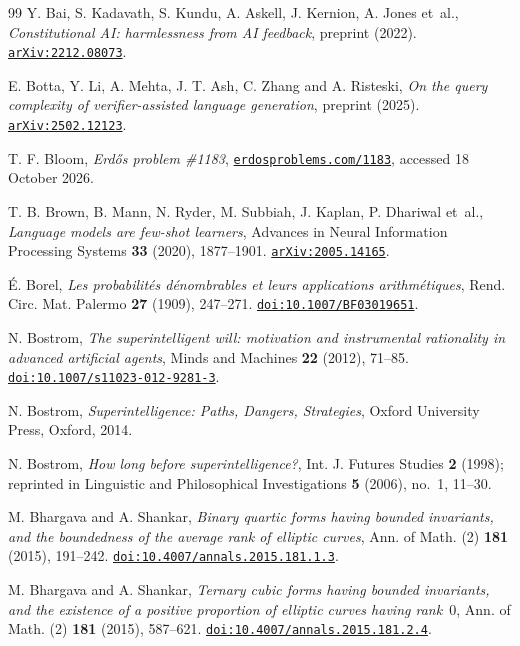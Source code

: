 \begin{thebibliography}{99}
Y. Bai, S. Kadavath, S. Kundu, A. Askell, J. Kernion, A. Jones et~al.,
\emph{Constitutional AI: harmlessness from AI feedback},
preprint (2022).
\href{https://arxiv.org/abs/2212.08073}{\nolinkurl{arXiv:2212.08073}}.

E. Botta, Y. Li, A. Mehta, J. T. Ash, C. Zhang and A. Risteski,
\emph{On the query complexity of verifier-assisted language generation},
preprint (2025).
\href{https://arxiv.org/abs/2502.12123}{\nolinkurl{arXiv:2502.12123}}.

T. F. Bloom,
\emph{Erd\H{o}s problem \#1183},
\href{https://www.erdosproblems.com/1183}{\nolinkurl{erdosproblems.com/1183}}, accessed 18 October 2026.

T. B. Brown, B. Mann, N. Ryder, M. Subbiah, J. Kaplan, P. Dhariwal et~al.,
\emph{Language models are few-shot learners},
Advances in Neural Information Processing Systems \textbf{33} (2020), 1877--1901.
\href{https://arxiv.org/abs/2005.14165}{\nolinkurl{arXiv:2005.14165}}.

\'E. Borel,
\emph{Les probabilit\'es d\'enombrables et leurs applications arithm\'etiques},
Rend. Circ. Mat. Palermo \textbf{27} (1909), 247--271.
\href{https://doi.org/10.1007/BF03019651}{\nolinkurl{doi:10.1007/BF03019651}}.

N. Bostrom,
\emph{The superintelligent will: motivation and instrumental rationality in advanced artificial agents},
Minds and Machines \textbf{22} (2012), 71--85.
\href{https://doi.org/10.1007/s11023-012-9281-3}{\nolinkurl{doi:10.1007/s11023-012-9281-3}}.

N. Bostrom,
\emph{Superintelligence: Paths, Dangers, Strategies},
Oxford University Press, Oxford, 2014.

N. Bostrom,
\emph{How long before superintelligence?},
Int. J. Futures Studies \textbf{2} (1998); reprinted in Linguistic and Philosophical Investigations \textbf{5} (2006), no.~1, 11--30.

M. Bhargava and A. Shankar,
\emph{Binary quartic forms having bounded invariants, and the boundedness of the average rank of elliptic curves},
Ann. of Math. (2) \textbf{181} (2015), 191--242.
\href{https://doi.org/10.4007/annals.2015.181.1.3}{\nolinkurl{doi:10.4007/annals.2015.181.1.3}}.

M. Bhargava and A. Shankar,
\emph{Ternary cubic forms having bounded invariants, and the existence of a positive proportion of elliptic curves having rank~$0$},
Ann. of Math. (2) \textbf{181} (2015), 587--621.
\href{https://doi.org/10.4007/annals.2015.181.2.4}{\nolinkurl{doi:10.4007/annals.2015.181.2.4}}.


\end{thebibliography}
